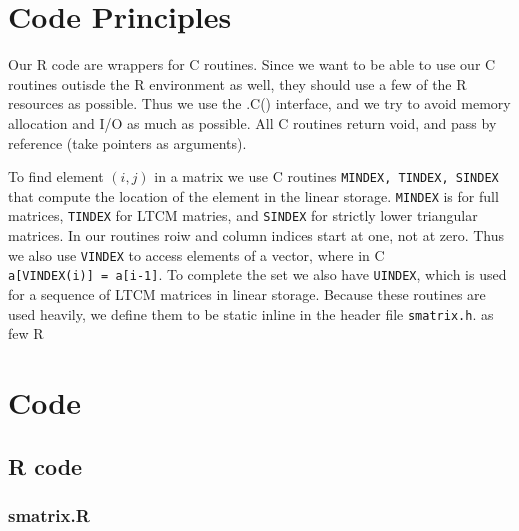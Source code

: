 \documentclass[12pt,]{article}
\begin{document}
\hypertarget{code-principles}{%
\section{Code Principles}\label{code-principles}}

Our R code are wrappers for C routines. Since we want to be able to use
our C routines outisde the R environment as well, they should use a few
of the R resources as possible. Thus we use the .C() interface, and we
try to avoid memory allocation and I/O as much as possible. All C
routines return void, and pass by reference (take pointers as
arguments).

To find element \((i,j)\) in a matrix we use C routines
\texttt{MINDEX,\ TINDEX,\ SINDEX} that compute the location of the
element in the linear storage. \texttt{MINDEX} is for full matrices,
\texttt{TINDEX} for LTCM matries, and \texttt{SINDEX} for strictly lower
triangular matrices. In our routines roiw and column indices start at
one, not at zero. Thus we also use \texttt{VINDEX} to access elements of
a vector, where in C \texttt{a{[}VINDEX(i){]}\ =\ a{[}i-1{]}}. To
complete the set we also have \texttt{UINDEX}, which is used for a
sequence of LTCM matrices in linear storage. Because these routines are
used heavily, we define them to be static inline in the header file
\texttt{smatrix.h}. as few R

\hypertarget{code}{%
\section{Code}\label{code}}

\hypertarget{r-code}{%
\subsection{R code}\label{r-code}}

\hypertarget{smatrix.r}{%
\subsubsection{smatrix.R}\label{smatrix.r}}
\end{document}

